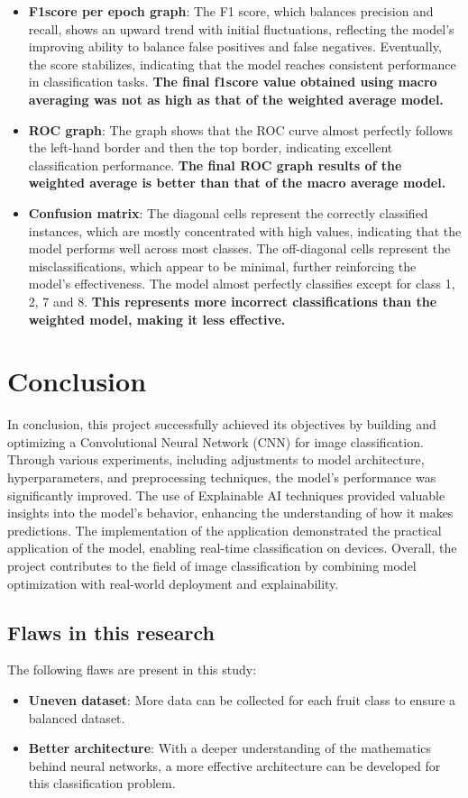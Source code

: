 \documentclass[a4paper,oneside,11pt]{book}
\begin{document}
\begin{itemize}
    \item \textbf{F1score per epoch graph}: The F1 score, which balances precision and recall, shows an upward trend with initial fluctuations, reflecting the model's improving ability to balance false positives and false negatives. Eventually, the score stabilizes, indicating that the model reaches consistent performance in classification tasks. \textbf{The final f1score value obtained using macro averaging was not as high as that of the weighted average model.}
    \item \textbf{ROC graph}: The graph shows that the ROC curve almost perfectly follows the left-hand border and then the top border, indicating excellent classification performance. \textbf{The final ROC graph results of the weighted average is better than that of the macro average model.}
    \item \textbf{Confusion matrix}: The diagonal cells represent the correctly classified instances, which are mostly concentrated with high values, indicating that the model performs well across most classes. The off-diagonal cells represent the misclassifications, which appear to be minimal, further reinforcing the model's effectiveness. The model almost perfectly classifies except for class 1, 2, 7 and 8. \textbf{This represents more incorrect classifications than the weighted model, making it less effective.}
\end{itemize}
\chapter{Conclusion}
In conclusion, this project successfully achieved its objectives by building and optimizing a Convolutional Neural Network (CNN) for image classification. Through various experiments, including adjustments to model architecture, hyperparameters, and preprocessing techniques, the model's performance was significantly improved. The use of Explainable AI techniques provided valuable insights into the model's behavior, enhancing the understanding of how it makes predictions. The implementation of the application demonstrated the practical application of the model, enabling real-time classification on devices. Overall, the project contributes to the field of image classification by combining model optimization with real-world deployment and explainability.
\section{Flaws in this research}
The following flaws are present in this study:
\begin{itemize}
    \item \textbf{Uneven dataset}: More data can be collected for each fruit class to ensure a balanced dataset.
    \item \textbf{Better architecture}: With a deeper understanding of the mathematics behind neural networks, a more effective architecture can be developed for this classification problem.
\end{itemize}
\end{document}
